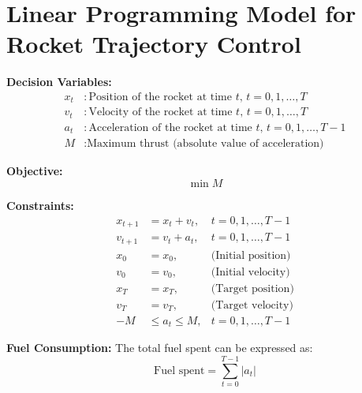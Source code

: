 \documentclass{article}
\begin{document}
\section*{Linear Programming Model for Rocket Trajectory Control}

\textbf{Decision Variables:}
\begin{align*}
x_t &: \text{Position of the rocket at time } t, \, t = 0, 1, \ldots, T \\
v_t &: \text{Velocity of the rocket at time } t, \, t = 0, 1, \ldots, T \\
a_t &: \text{Acceleration of the rocket at time } t, \, t = 0, 1, \ldots, T-1 \\
M   &: \text{Maximum thrust (absolute value of acceleration)}
\end{align*}

\textbf{Objective:}
\[
\min M
\]

\textbf{Constraints:}
\begin{align*}
x_{t+1} &= x_t + v_t, & t = 0, 1, \ldots, T-1 \\
v_{t+1} &= v_t + a_t, & t = 0, 1, \ldots, T-1 \\
x_0 &= x_0, & \text{(Initial position)} \\
v_0 &= v_0, & \text{(Initial velocity)} \\
x_T &= x_T, & \text{(Target position)} \\
v_T &= v_T, & \text{(Target velocity)} \\
-M &\le a_t \le M, & t = 0, 1, \ldots, T-1
\end{align*}

\textbf{Fuel Consumption:}
The total fuel spent can be expressed as:
\[
\text{Fuel spent} = \sum_{t=0}^{T-1} |a_t|
\]
\end{document}
